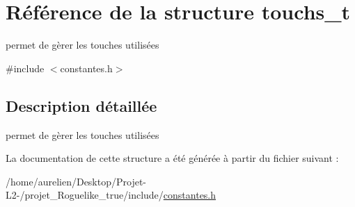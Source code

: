 \hypertarget{structtouchs__t}{}\section{Référence de la structure touchs\+\_\+t}
\label{structtouchs__t}


permet de gèrer les touches utilisées  




{\ttfamily \#include $<$constantes.\+h$>$}



\subsection{Description détaillée}
permet de gèrer les touches utilisées 

La documentation de cette structure a été générée à partir du fichier suivant \+:\begin{DoxyCompactItemize}
\item 
/home/aurelien/\+Desktop/\+Projet-\/\+L2-\//projet\+\_\+\+Roguelike\+\_\+true/include/\hyperlink{constantes_8h}{constantes.\+h}\end{DoxyCompactItemize}
